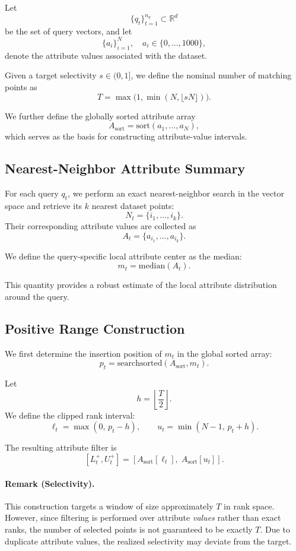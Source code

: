 Let 
\[
\{q_t\}_{t=1}^{n_q} \subset \mathbb{R}^d
\]
be the set of query vectors, and let
\[
\{a_i\}_{i=1}^{N}, \quad a_i \in \{0, \dots, 1000\},
\]
denote the attribute values associated with the dataset.

Given a target selectivity $s \in (0,1]$, we define the nominal number of matching points as
\[
T = \max\bigl(1, \min(N, \lfloor sN \rfloor)\bigr).
\]

We further define the globally sorted attribute array
\[
A_{\mathrm{sort}} = \mathrm{sort}(a_1, \dots, a_N),
\]
which serves as the basis for constructing attribute-value intervals.

\subsection{Nearest-Neighbor Attribute Summary}

For each query $q_t$, we perform an exact nearest-neighbor search in the vector space and retrieve its $k$ nearest dataset points:
\[
N_t = \{i_1, \dots, i_k\}.
\]
Their corresponding attribute values are collected as
\[
A_t = \{a_{i_1}, \dots, a_{i_k}\}.
\]

We define the query-specific local attribute center as the median:
\[
m_t = \mathrm{median}(A_t).
\]

This quantity provides a robust estimate of the local attribute distribution around the query.

\subsection{Positive Range Construction}

We first determine the insertion position of $m_t$ in the global sorted array:
\[
p_t = \mathrm{searchsorted}(A_{\mathrm{sort}}, m_t).
\]

Let
\[
h = \left\lfloor \frac{T}{2} \right\rfloor.
\]
We define the clipped rank interval:
\[
\ell_t = \max(0,\, p_t - h), \qquad
u_t = \min(N-1,\, p_t + h).
\]

The resulting attribute filter is
\[
[L_t^+, U_t^+] = [A_{\mathrm{sort}}[\ell_t],\; A_{\mathrm{sort}}[u_t]].
\]

\paragraph{Remark (Selectivity).}
This construction targets a window of size approximately $T$ in rank space. However, since filtering is performed over attribute \emph{values} rather than exact ranks, the number of selected points is not guaranteed to be exactly $T$. Due to duplicate attribute values, the realized selectivity may deviate from the target.

